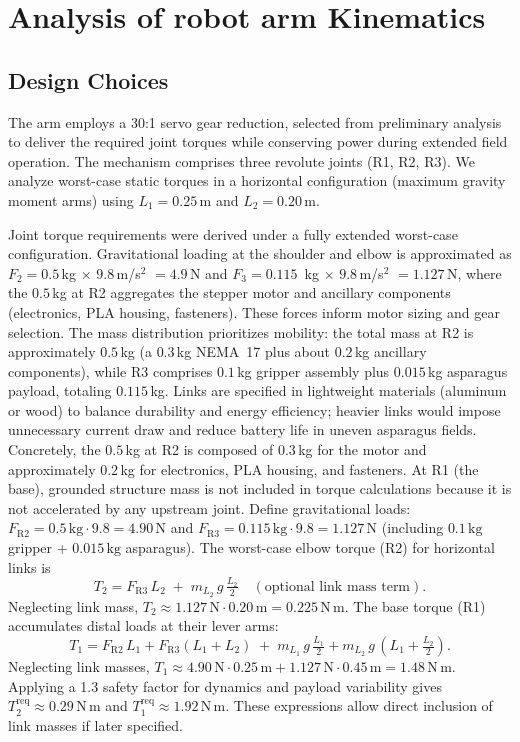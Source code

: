 \chapter{Analysis of robot arm Kinematics}


\section{Design Choices}

The arm employs a 30:1 servo gear reduction, selected from preliminary analysis to deliver the 
required joint torques while conserving power during extended field operation. The mechanism comprises 
three revolute joints (R1, R2, R3). We analyze worst-case static torques in a horizontal configuration (maximum gravity moment arms) 
using \(L_1 = 0.25\,\mathrm{m}\) and \(L_2 = 0.20\,\mathrm{m}\).

Joint torque requirements were derived under a fully extended worst-case configuration. Gravitational 
loading at the shoulder and elbow is approximated as $F_2 = 0.5$\,kg $\times$ $9.8$\,m/s$^2$ $= 4.9$\,N and $F_3 = 0.115$\,
kg $\times$ $9.8$\,m/s$^2$ $= 1.127$\,N, where the $0.5$\,kg at R2 aggregates the stepper motor and ancillary components (electronics, 
PLA housing, fasteners). These forces inform motor sizing and gear selection. The mass distribution prioritizes mobility: the total mass 
at R2 is approximately $0.5$\,kg (a $0.3$\,kg NEMA~17 plus about $0.2$\,kg ancillary components), while R3 comprises $0.1$\,kg gripper assembly 
plus $0.015$\,kg asparagus payload, totaling $0.115$\,kg. Links are specified in 
lightweight materials (aluminum or wood) to balance durability and energy efficiency; heavier links would impose unnecessary current 
draw and reduce battery life in uneven asparagus fields.
Concretely, the $0.5$\,kg at R2 is composed of $0.3$\,kg for the motor and approximately $0.2$\,kg for electronics, PLA housing, and fasteners. At 
R1 (the base), grounded structure mass is not included in torque calculations because it is not accelerated by any upstream joint.
Define gravitational loads: $F_{\mathrm{R2}}=0.5\,\mathrm{kg}\cdot 9.8=4.90\,\mathrm{N}$ and $F_{\mathrm{R3}}=0.115\,\mathrm{kg}\cdot 9.8=1.127\,
\mathrm{N}$ (including $0.1\,\mathrm{kg}$ gripper + $0.015\,\mathrm{kg}$ asparagus). The worst-case elbow torque (R2) for horizontal links is
\[
T_2=F_{\mathrm{R3}}\,L_2\; +\; m_{L_2}\,g\,\tfrac{L_2}{2} \quad (\text{optional link mass term}).
\]
Neglecting link mass, $T_2\approx 1.127\,\mathrm{N}\cdot 0.20\,\mathrm{m}=0.225\,\mathrm{N\,m}$. The base torque (R1) accumulates distal loads 
at their lever arms:
\[
T_1=F_{\mathrm{R2}}\,L_1+F_{\mathrm{R3}}(L_1+L_2)\; +\; m_{L_1}\,g\,\tfrac{L_1}{2}+m_{L_2}\,g\,(L_1+\tfrac{L_2}{2}).
\]
Neglecting link masses, $T_1\approx 4.90\,\mathrm{N}\cdot 0.25\,\mathrm{m}+1.127\,\mathrm{N}\cdot 0.45\,\mathrm{m}=1.48\,\mathrm{N\,m}$. Applying 
a 1.3 safety factor for dynamics and payload variability 
gives $T_2^{\mathrm{req}}\approx0.29\,\mathrm{N\,m}$ and $T_1^{\mathrm{req}}\approx1.92\,\mathrm{N\,m}$. These expressions allow direct 
inclusion of link masses if later specified.

